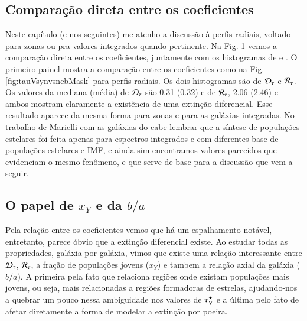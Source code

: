 \subsection{Comparação direta entre os coeficientes}
\label{sec:difextin:emp:comparetauV}

Neste capítulo (e nos seguintes) me atenho a discussão à perfis radiais, voltado para zonas ou pra
valores integrados quando pertinente. Na Fig. \ref{fig:tauVhisto} vemos a comparação direta entre os
coeficientes, juntamente com os histogramas de \Dtau e \Rtau. O primeiro painel mostra a comparação
entre os coeficientes como na Fig. \ref{fig:tauVsynvsnebMask} para perfis radiais. Os dois
histogramas são de $\Dtau$ e $\Rtau$. Os valores da mediana (média) de $\Dtau$ são 0.31 (0.32) e de
$\Rtau$, 2.06 (2.46) e ambos mostram claramente a existência de uma extinção diferencial. Esse
resultado aparece da mesma forma para zonas e para as galáxias integradas. No trabalho de Marielli
com as galáxias do \SDSS cabe lembrar que a síntese de populações estelares foi feita apenas para
espectros integrados e com diferentes base de populações estelares e IMF, e ainda sim encontramos
valores parecidos que evidenciam o mesmo fenômeno, e que serve de base para a discussão que vem a
seguir.

\begin{figure}
	\centering
	\caption[Comparação $\tauVS$ e histogramas de $\Dtau$ e $\Rtau$.]
	{}
	\label{fig:tauVhisto}
\end{figure}

\subsection{O papel de $x_Y$ e da $b/a$}
\label{sec:difextin:emp:xYcosi}

Pela relação entre os coeficientes vemos que há um espalhamento notável, entretanto, parece óbvio
que a extinção diferencial existe. Ao estudar todas as propriedades, galáxia por galáxia, vimos que
existe uma relação interessante entre $\Dtau$, $\Rtau$, a fração de populações jovens ($x_Y$) e
tambem a relação axial da galáxia ($b/a$). A primeira pela fato que relaciona regiões onde existam
populações mais jovens, ou seja, mais relacionadas a regiões formadoras de estrelas, ajudando-nos a quebrar um
pouco nessa ambiguidade nos valores de $\tauVS$ e a última pelo fato de afetar diretamente a forma
de modelar a extinção por poeira.

